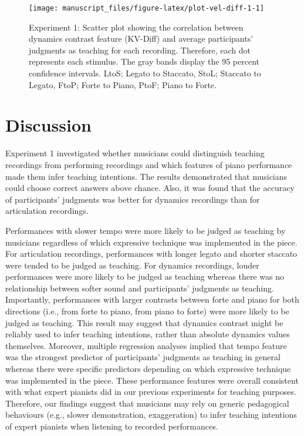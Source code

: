 \documentclass[
  man,floatsintext]{apa6}
\begin{document}
\begin{figure}

{\centering \texttt{[image: manuscript\_files/figure-latex/plot-vel-diff-1-1]} 

}

\caption{\label{fig:vel-diff-1}Experiment 1: Scatter plot showing the correlation between dynamics contrast feature (KV-Diff) and average participants' judgments as teaching for each recording. Therefore, each dot represents each stimulus. The gray bands display the 95 percent confidence intervals. LtoS; Legato to Staccato, StoL; Staccato to Legato, FtoP; Forte to Piano, PtoF; Piano to Forte.}\label{fig:plot-vel-diff-1}
\end{figure}

\clearpage

\hypertarget{discussion}{%
\section{Discussion}\label{discussion}}

Experiment 1 investigated whether musicians could distinguish teaching recordings from performing recordings and which features of piano performance made them infer teaching intentions. The results demonstrated that musicians could choose correct answers above chance. Also, it was found that the accuracy of participants' judgments was better for dynamics recordings than for articulation recordings.

Performances with slower tempo were more likely to be judged as teaching by musicians regardless of which expressive technique was implemented in the piece. For articulation recordings, performances with longer legato and shorter staccato were tended to be judged as teaching. For dynamics recordings, louder performances were more likely to be judged as teaching whereas there was no relationship between softer sound and participants' judgments as teaching. Importantly, performances with larger contrasts between forte and piano for both directions (i.e., from forte to piano, from piano to forte) were more likely to be judged as teaching. This result may suggest that dynamics contrast might be reliably used to infer teaching intentions, rather than absolute dynamics values themselves. Moreover, multiple regression analyses implied that tempo feature was the strongest predictor of participants' judgments as teaching in general whereas there were specific predictors depending on which expressive technique was implemented in the piece. These performance features were overall consistent with what expert pianists did in our previous experiments for teaching purposes. Therefore, our findings suggest that musicians may rely on generic pedagogical behaviours (e.g., slower demonstration, exaggeration) to infer teaching intentions of expert pianists when listening to recorded performances.
\end{document}

